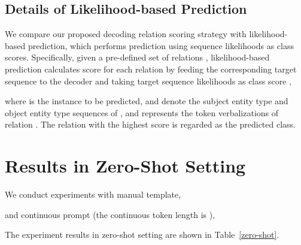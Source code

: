 \documentclass[11pt]{article}
\begin{document}
\subsection{Details of Likelihood-based Prediction}\label{D.4}
We compare our proposed decoding relation scoring strategy with likelihood-based prediction, which performs prediction using sequence likelihoods as class scores. Specifically, given a pre-defined set of relations , likelihood-based prediction calculates score for each relation  by feeding the corresponding target sequence  to the decoder and taking target sequence likelihoods as class score , 

where  is the instance to be predicted,  and  denote the subject entity type and object entity type sequences of , and  represents the token verbalizations of relation . The relation with the highest score is regarded as the predicted class.
\section{Results in Zero-Shot Setting}\label{F}
We conduct experiments with manual template,

and continuous prompt (the continuous token length is ),

The experiment results in zero-shot setting are shown in Table~\ref{zero-shot}.
\end{document}
